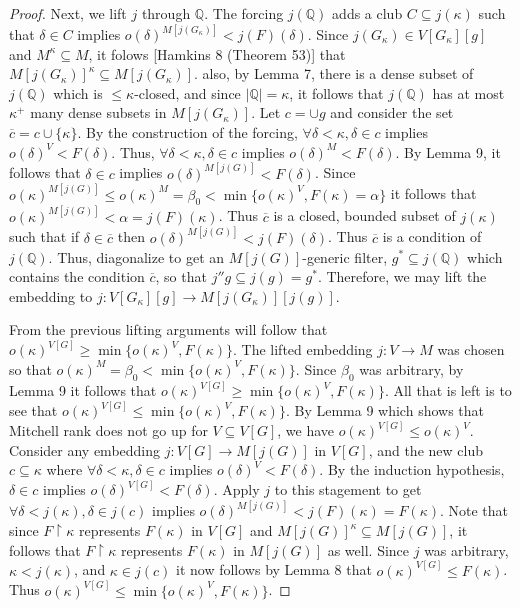 \documentclass[10pt,leqno]{amsart}
\begin{document}
\begin{proof}
Next, we lift $j$ through $\mathbb{Q}$. The forcing $j(\mathbb{Q})$ adds a club $C \subseteq j(\kappa)$ such that $\delta \in C$ implies $o(\delta)^{M[j(G_{\kappa})]} < j(F)(\delta)$. Since $j(G_{\kappa}) \in V[G_{\kappa}][g]$ and $M^{\kappa} \subseteq M$, it folows [Hamkins 8 (Theorem 53)] that $M[j(G_{\kappa})]^{\kappa} \subseteq M[j(G_{\kappa})]$. also, by Lemma 7, there is a dense subset of $j(\mathbb{Q})$ which is $\le \kappa$-closed, and since $|\mathbb{Q}| = \kappa$, it follows that $j(\mathbb{Q})$ has at most $\kappa^+$ many dense subsets in $M[j(G_{\kappa})]$. Let $c = \cup g$ and consider the set $\overline{c} = c \cup \{\kappa\}$. By the construction of the forcing, $\forall \delta < \kappa, \delta \in c$ implies $o(\delta)^V < F(\delta)$. Thus, $\forall \delta < \kappa, \delta \in c$ implies $o(\delta)^M < F(\delta)$. By Lemma 9, it follows that $\delta \in c$ implies $o(\delta)^{M[j(G)]} < F(\delta)$. Since $o(\kappa)^{M[j(G)]} \le o(\kappa)^M = \beta_0 < \min\{o(\kappa)^V, F(\kappa) = \alpha\}$ it follows that $o(\kappa)^{M[j(G)]} < \alpha = j(F)(\kappa)$. Thus $\overline{c}$ is a closed, bounded subset of $j(\kappa)$ such that if $\delta \in \overline{c}$ then $o(\delta)^{M[j(G)]} < j(F)(\delta)$. Thus $\overline{c}$ is a condition of $j(\mathbb{Q})$. Thus, diagonalize to get an $M[j(G)]$-generic filter, $g^* \subseteq j(\mathbb{Q})$ which contains the condition $\overline{c}$, so that $j''g \subseteq j(g) = g^*$. Therefore, we may lift the embedding to $j:V[G_{\kappa}][g] \to M[j(G_{\kappa})][j(g)]$.

From the previous lifting arguments will follow that $o(\kappa)^{V[G]} \ge \min\{o(\kappa)^V, F(\kappa)\}$. The lifted embedding $j: V \to M$ was chosen so that $o(\kappa)^M = \beta_0 < \min\{o(\kappa)^V, F(\kappa)\}$. Since $\beta_0$ was arbitrary, by Lemma 9 it follows that $o(\kappa)^{V[G]} \ge \min\{o(\kappa)^V, F(\kappa)\}$. All that is left is to see that $o(\kappa)^{V[G]} \le \min\{o(\kappa)^V, F(\kappa)\}$. By Lemma 9 which shows that Mitchell rank does not go up for $V \subseteq V[G]$, we have $o(\kappa)^{V[G]} \le o(\kappa)^V$. Consider any embedding $j:V[G] \to M[j(G)]$ in $V[G]$, and the new club $c \subseteq \kappa$ where $\forall \delta < \kappa, \delta \in c$ implies $o(\delta)^V < F(\delta)$. By the induction hypothesis, $\delta \in c$ implies $o(\delta)^{V[G]} < F(\delta)$. Apply $j$ to this stagement to get $\forall \delta < j(\kappa), \delta \in j(c)$ implies $o(\delta)^{M[j(G)]} < j(F)(\kappa) = F(\kappa)$. Note that since $F \upharpoonright \kappa$ represents $F(\kappa)$ in $V[G]$ and $M[j(G)]^{\kappa} \subseteq M[j(G)]$, it follows that $F \upharpoonright \kappa$ represents $F(\kappa)$ in $M[j(G)]$ as well. Since $j$ was arbitrary, $\kappa < j(\kappa)$, and $\kappa \in j(c)$ it now follows by Lemma 8 that $o(\kappa)^{V[G]} \le F(\kappa)$. Thus $o(\kappa)^{V[G]} \le \min\{o(\kappa)^V, F(\kappa)\}$.
\end{proof}
\end{document}
